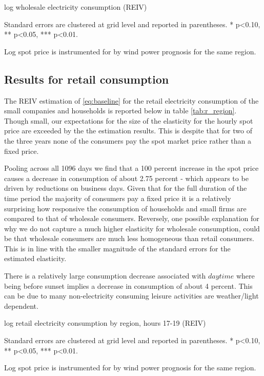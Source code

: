 \begin{table}[H]
\begin{threeparttable}
  \centering
  \caption{log wholesale electricity consumption (REIV)}
  \footnotesize
        
    \begin{tablenotes}
    \item Standard errors are clustered at grid level and reported in parentheses. * p<0.10, ** p<0.05, *** p<0.01.
    \item Log spot price is instrumented for by wind power prognosis for the same region.
     \end{tablenotes}
  \label{tab:ws_preferred}
\end{threeparttable}
\end{table}


\subsection{Results for retail consumption}
\label{subsec:r_households}
The REIV estimation of \eqref{eq:baseline} for the retail electricity consumption of the small companies and households is reported below in table \ref{tab:r_region}. Though small, our expectations for the size of the elasticity for the hourly spot price are exceeded by the the estimation results. This is despite that for two of the three years none of the consumers pay the spot market price rather than a fixed price.
\bigskip\par
Pooling across all 1096 days we find that a 100 percent increase in the spot price causes a decrease in consumption of about 2.75 percent - which appears to be driven by reductions on business days. Given that for the full duration of the time period the majority of consumers pay a fixed price it is a relatively surprising how responsive the consumption of households and small firms are compared to that of wholesale consumers. Reversely, one possible explanation for why we do not capture a much higher elasticity for wholesale consumption, could be that wholesale consumers are much less homogeneous than retail consumers. This is in line with the smaller magnitude of the standard errors for the estimated elasticity.
\bigskip\par
There is a relatively large consumption decrease associated with $daytime$ where being before sunset implies a decrease in consumption of about 4 percent. This can be due to many non-electricity consuming leisure activities are weather/light dependent.
\begin{table}[H]
\begin{threeparttable}
  \centering
  \caption{log retail electricity consumption by region, hours 17-19 (REIV)}
  \label{tab:r_region}
  \footnotesize
    
    \begin{tablenotes}
    \item Standard errors are clustered at grid level and reported in parentheses. * p<0.10, ** p<0.05, *** p<0.01.
    \item Log spot price is instrumented for by wind power prognosis for the same region.
  \end{tablenotes}
\end{threeparttable}
\end{table}
